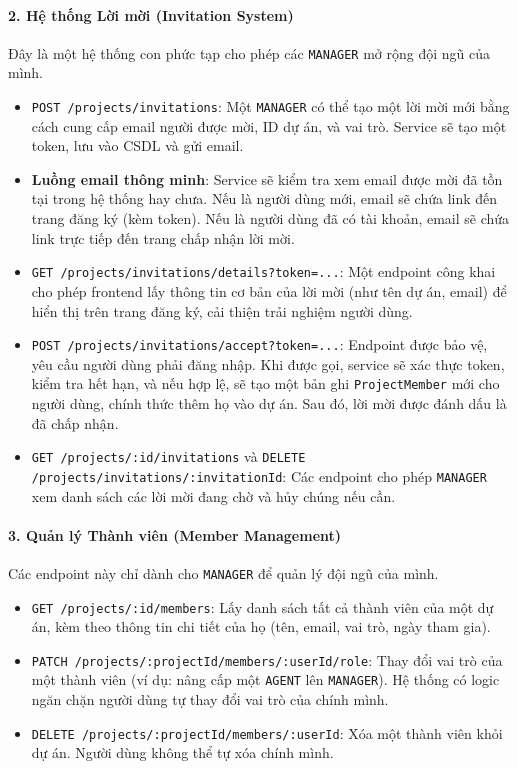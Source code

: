 \paragraph{2. Hệ thống Lời mời (Invitation System)}
Đây là một hệ thống con phức tạp cho phép các \texttt{MANAGER} mở rộng đội ngũ của mình.
\begin{itemize}
    \item \texttt{POST /projects/invitations}: Một \texttt{MANAGER} có thể tạo một lời mời mới bằng cách cung cấp email người được mời, ID dự án, và vai trò. Service sẽ tạo một token, lưu vào CSDL và gửi email.
    \item \textbf{Luồng email thông minh}: Service sẽ kiểm tra xem email được mời đã tồn tại trong hệ thống hay chưa. Nếu là người dùng mới, email sẽ chứa link đến trang đăng ký (kèm token). Nếu là người dùng đã có tài khoản, email sẽ chứa link trực tiếp đến trang chấp nhận lời mời.
    \item \texttt{GET /projects/invitations/details?token=...}: Một endpoint công khai cho phép frontend lấy thông tin cơ bản của lời mời (như tên dự án, email) để hiển thị trên trang đăng ký, cải thiện trải nghiệm người dùng.
    \item \texttt{POST /projects/invitations/accept?token=...}: Endpoint được bảo vệ, yêu cầu người dùng phải đăng nhập. Khi được gọi, service sẽ xác thực token, kiểm tra hết hạn, và nếu hợp lệ, sẽ tạo một bản ghi \texttt{ProjectMember} mới cho người dùng, chính thức thêm họ vào dự án. Sau đó, lời mời được đánh dấu là đã chấp nhận.
    \item \texttt{GET /projects/:id/invitations} và \texttt{DELETE /projects/invitations/:invitationId}: Các endpoint cho phép \texttt{MANAGER} xem danh sách các lời mời đang chờ và hủy chúng nếu cần.
\end{itemize}

\paragraph{3. Quản lý Thành viên (Member Management)}
Các endpoint này chỉ dành cho \texttt{MANAGER} để quản lý đội ngũ của mình.
\begin{itemize}
    \item \texttt{GET /projects/:id/members}: Lấy danh sách tất cả thành viên của một dự án, kèm theo thông tin chi tiết của họ (tên, email, vai trò, ngày tham gia).
    \item \texttt{PATCH /projects/:projectId/members/:userId/role}: Thay đổi vai trò của một thành viên (ví dụ: nâng cấp một \texttt{AGENT} lên \texttt{MANAGER}). Hệ thống có logic ngăn chặn người dùng tự thay đổi vai trò của chính mình.
    \item \texttt{DELETE /projects/:projectId/members/:userId}: Xóa một thành viên khỏi dự án. Người dùng không thể tự xóa chính mình.
\end{itemize}

